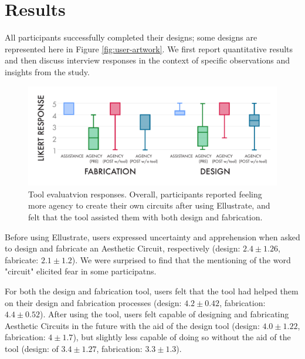 \documentclass{sigchi}
\begin{document}
\section{Results}
All participants successfully completed their designs; some designs are represented here in Figure \ref{fig:user-artwork}. 
We first report quantitative results and then discuss interview responses in the context of specific observations and insights from the study.

\begin{figure}[t]
\centering
\includegraphics[width=1.0\columnwidth]{charts/boxplots_quant.pdf}
\caption{Tool evaluatvion responses. Overall, participants reported feeling more agency to create their own circuits after using Ellustrate, and felt that the tool assisted them with both design and fabrication.}
\label{fig:fab_tool_results}
\vspace{-20pt}
\end{figure}

Before using Ellustrate, users expressed uncertainty and apprehension when asked to design and fabricate an Aesthetic Circuit, respectively (design:  $2.4 \pm 1.26$, fabricate:  $2.1 \pm 1.2$). We were surprised to find that the mentioning of the word "circuit" elicited fear in some participatns. 

For both the design and fabrication tool, users felt that the tool had helped them on their design and fabrication processes (design:  $4.2 \pm 0.42$, fabrication:  $4.4 \pm 0.52$). After using the tool, users felt capable of designing and fabricating Aesthetic Circuits in the future with the aid of the design tool (design:  $4.0 \pm 1.22$, fabrication:  $4 \pm 1.7$), but slightly less capable of doing so without the aid of the tool (design:  of $3.4 \pm 1.27$, fabrication:  $3.3 \pm 1.3$). 
  
\end{document}
